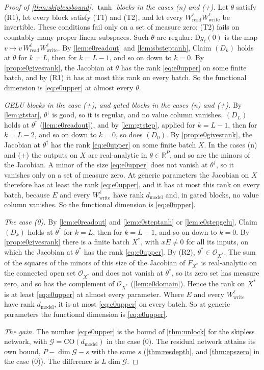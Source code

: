 \documentclass[10pt]{article}
\theoremstyle{definition}
\theoremstyle{remark}
\newcommand{\R}{\mathbb{R}}
\newcommand{\Wread}{W_{\mathrm{read}}}
\newcommand{\Wwrite}{W_{\mathrm{write}}}
\newcommand{\dm}{d_{\mathrm{model}}}
\newcommand{\CO}{\mathrm{CO}}
\newcommand{\Der}{\mathrm{D}}
\newcommand{\G}{\mathcal{G}}
\begin{document}
\begin{proof}[Proof of \cref{thm:skiplessbound}]
\emph{$\tanh$ blocks in the cases (n) and (+).} Let $\theta$ satisfy (R1), let every block satisfy (T1) and (T2), and let every $\Wread^{\ell}\Wwrite^{\ell}$ be invertible. These conditions fail only on a set of measure zero; (T2) fails on countably many proper linear subspaces. Such $\theta$ are regular: $\Der g_\ell(0)$ is the map $v \mapsto v\,\Wread^{\ell}\Wwrite^{\ell}$. By \cref{lem:e0readout} and \cref{lem:sbsteptanh}, Claim $(D_k)$ holds at $\theta$ for $k = L$, then for $k = L-1$, and so on down to $k = 0$. By \cref{prop:e0givesrank}, the Jacobian at $\theta$ has the rank \eqref{eq:e0upper} on some finite batch, and by (R1) it has at most this rank on every batch. So the functional dimension is \eqref{eq:e0upper} at almost every $\theta$.

\emph{GELU blocks in the case (+), and gated blocks in the cases (n) and (+).} By \cref{lem:gtstar}, $\theta^\dagger$ is good, so it is regular, and no value column vanishes. $(D_L)$ holds at $\theta^\dagger$ (\cref{lem:e0readout}), and by \cref{lem:gtstep}, applied for $k = L-1$, then for $k = L-2$, and so on down to $k = 0$, so does $(D_0)$. By \cref{prop:e0givesrank}, the Jacobian at $\theta^\dagger$ has the rank \eqref{eq:e0upper} on some finite batch $X$. In the cases (n) and (+) the outputs on $X$ are real-analytic in $\theta \in \R^P$, and so are the minors of the Jacobian. A minor of the size \eqref{eq:e0upper} does not vanish at $\theta^\dagger$, so it vanishes only on a set of measure zero. At generic parameters the Jacobian on $X$ therefore has at least the rank \eqref{eq:e0upper}, and it has at most this rank on every batch, because $E$ and every $\Wwrite^{\ell}$ have rank $\dm$ and, in gated blocks, no value column vanishes. So the functional dimension is \eqref{eq:e0upper}.

\emph{The case (0).} By \cref{lem:e0readout} and \cref{lem:e0steptanh} or \cref{lem:e0stepgelu}, Claim $(D_k)$ holds at $\theta^*$ for $k = L$, then for $k = L-1$, and so on down to $k = 0$. By \cref{prop:e0givesrank} there is a finite batch $X^*$, with $xE \neq 0$ for all its inputs, on which the Jacobian at $\theta^*$ has the rank \eqref{eq:e0upper}. By (R2), $\theta^* \in \mathcal O_{X^*}$. The sum of the squares of the minors of this size of the Jacobian of $F_{X^*}$ is real-analytic on the connected open set $\mathcal O_{X^*}$ and does not vanish at $\theta^*$, so its zero set has measure zero, and so has the complement of $\mathcal O_{X^*}$ (\cref{lem:e0domain}). Hence the rank on $X^*$ is at least \eqref{eq:e0upper} at almost every parameter. Where $E$ and every $\Wwrite^{\ell}$ have rank $\dm$, it is at most \eqref{eq:e0upper} on every batch. So at generic parameters the functional dimension is \eqref{eq:e0upper}.

\emph{The gain.} The number \eqref{eq:e0upper} is the bound of \cref{thm:unlock} for the skipless network, with $\G = \CO(\dm)$ in the case (0). The residual network attains its own bound, $P - \dim\G - s$ with the same $s$ (\cref{thm:resdepth}, and \cref{thm:epszero} in the case (0)). The difference is $L\dim\G$.
\end{proof}
\end{document}
